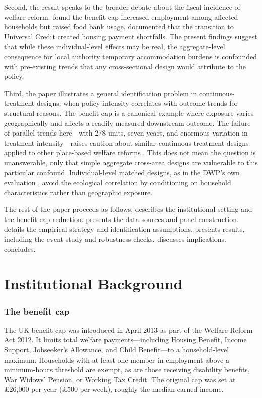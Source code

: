 \documentclass[12pt]{article}
\begin{document}
Second, the result speaks to the broader debate about the fiscal incidence of welfare reform. \citet{reeves2017benefit} found the benefit cap increased employment among affected households but raised food bank usage. \citet{brewer2019universal} documented that the transition to Universal Credit created housing payment shortfalls. The present findings suggest that while these individual-level effects may be real, the aggregate-level consequence for local authority temporary accommodation burdens is confounded with pre-existing trends that any cross-sectional design would attribute to the policy.

Third, the paper illustrates a general identification problem in continuous-treatment designs: when policy intensity correlates with outcome trends for structural reasons. The benefit cap is a canonical example where exposure varies geographically and affects a readily measured downstream outcome. The failure of parallel trends here---with 278 units, seven years, and enormous variation in treatment intensity---raises caution about similar continuous-treatment designs applied to other place-based welfare reforms \citep{bronchetti2023benefit, clarke2020welfare}. This does not mean the question is unanswerable, only that simple aggregate cross-area designs are vulnerable to this particular confound. Individual-level matched designs, as in the DWP's own evaluation \citep{dwp2019lowerbenefit}, avoid the ecological correlation by conditioning on household characteristics rather than geographic exposure.

The rest of the paper proceeds as follows.  describes the institutional setting and the benefit cap reduction.  presents the data sources and panel construction.  details the empirical strategy and identification assumptions.  presents results, including the event study and robustness checks.  discusses implications.  concludes.

\section{Institutional Background}
\label{sec:background}

\subsubsection*{The benefit cap} The UK benefit cap was introduced in April 2013 as part of the Welfare Reform Act 2012. It limits total welfare payments---including Housing Benefit, Income Support, Jobseeker's Allowance, and Child Benefit---to a household-level maximum. Households with at least one member in employment above a minimum-hours threshold are exempt, as are those receiving disability benefits, War Widows' Pension, or Working Tax Credit. The original cap was set at \pounds26,000 per year (\pounds500 per week), roughly the median earned income.
\end{document}
